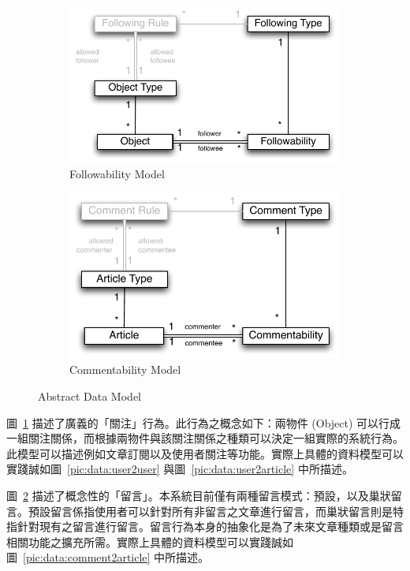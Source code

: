 \documentclass[12pt]{article}
\begin{document}
\begin{figure}[h]
\begin{subfigure}[b]{0.5\textwidth}
\includegraphics[width=\textwidth]{img/dm1.pdf}
\caption{Followability Model}
\label{pic:data:followability}
\end{subfigure}
\begin{subfigure}[b]{0.5\textwidth}
\includegraphics[width=\textwidth]{img/dm2.pdf}
\caption{Commentability Model}
\label{pic:data:commentability}
\end{subfigure}
\caption{Abstract Data Model}
\label{pic:data:adm}
\end{figure}


圖~\ref{pic:data:followability} 描述了廣義的「關注」行為。此行為之概念如下：兩物件 (Object)  可以行成一組關注關係，而根據兩物件與該關注關係之種類可以決定一組實際的系統行為。此模型可以描述例如文章訂閱以及使用者關注等功能。實際上具體的資料模型可以實踐誠如圖~\ref{pic:data:user2user} 與圖~\ref{pic:data:user2article} 中所描述。

圖~\ref{pic:data:commentability} 描述了概念性的「留言」。本系統目前僅有兩種留言模式：預設，以及巢狀留言。預設留言係指使用者可以針對所有非留言之文章進行留言，而巢狀留言則是特指針對現有之留言進行留言。留言行為本身的抽象化是為了未來文章種類或是留言相關功能之擴充所需。實際上具體的資料模型可以實踐誠如圖~\ref{pic:data:comment2article} 中所描述。
\end{document}
